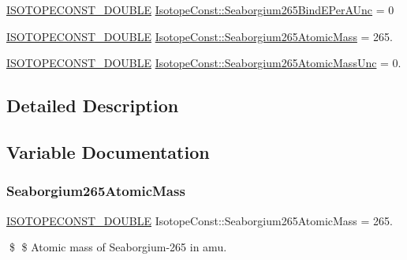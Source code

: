 \begin{DoxyCompactItemize}
\mbox{\hyperlink{group___isotope_const-_macros_ga8f45a7272ce02c0b4c65c44636ed719a}{I\+S\+O\+T\+O\+P\+E\+C\+O\+N\+S\+T\+\_\+\+D\+O\+U\+B\+LE}} \mbox{\hyperlink{group___isotope_const-_seaborgium-_sg265_gadf583490246c8dec43e79cacb15769f9}{Isotope\+Const\+::\+Seaborgium265\+Bind\+E\+Per\+A\+Unc}} = 0
\item 
\mbox{\hyperlink{group___isotope_const-_macros_ga8f45a7272ce02c0b4c65c44636ed719a}{I\+S\+O\+T\+O\+P\+E\+C\+O\+N\+S\+T\+\_\+\+D\+O\+U\+B\+LE}} \mbox{\hyperlink{group___isotope_const-_seaborgium-_sg265_gaf647831ef4786706e369244b84bd31aa}{Isotope\+Const\+::\+Seaborgium265\+Atomic\+Mass}} = 265.
\item 
\mbox{\hyperlink{group___isotope_const-_macros_ga8f45a7272ce02c0b4c65c44636ed719a}{I\+S\+O\+T\+O\+P\+E\+C\+O\+N\+S\+T\+\_\+\+D\+O\+U\+B\+LE}} \mbox{\hyperlink{group___isotope_const-_seaborgium-_sg265_ga480227073e6ce43172a5ac7711822d99}{Isotope\+Const\+::\+Seaborgium265\+Atomic\+Mass\+Unc}} = 0.
\end{DoxyCompactItemize}


\subsection{Detailed Description}


\subsection{Variable Documentation}
\mbox{\label{group___isotope_const-_seaborgium-_sg265_gaf647831ef4786706e369244b84bd31aa}} 
\subsubsection{\texorpdfstring{Seaborgium265\+Atomic\+Mass}{Seaborgium265AtomicMass}}
{\footnotesize\ttfamily \mbox{\hyperlink{group___isotope_const-_macros_ga8f45a7272ce02c0b4c65c44636ed719a}{I\+S\+O\+T\+O\+P\+E\+C\+O\+N\+S\+T\+\_\+\+D\+O\+U\+B\+LE}} Isotope\+Const\+::\+Seaborgium265\+Atomic\+Mass = 265.}

\$ \$ Atomic mass of Seaborgium-\/265 in amu. \mbox{\label{group___isotope_const-_seaborgium-_sg265_ga480227073e6ce43172a5ac7711822d99}} 
